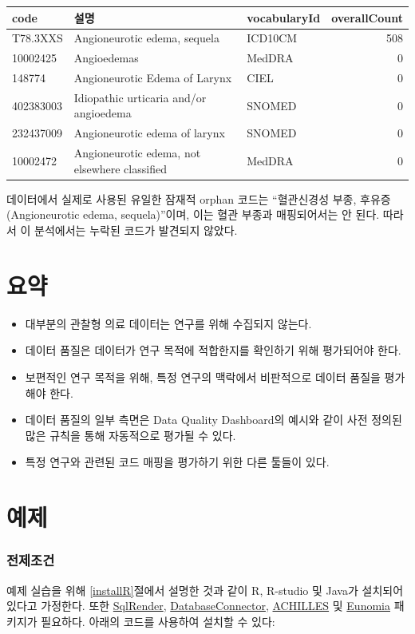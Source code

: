 \documentclass[10.5pt]{book}
\theoremstyle{definition}
\theoremstyle{definition}
\theoremstyle{definition}
\theoremstyle{remark}
\let\BeginKnitrBlock\begin \let\EndKnitrBlock\end
\begin{document}
\begin{longtable}[]{@{}lllr@{}}
\toprule
code & 설명 & vocabularyId & overallCount\tabularnewline
\midrule
\endhead
T78.3XXS & Angioneurotic edema, sequela & ICD10CM & 508\tabularnewline
10002425 & Angioedemas & MedDRA & 0\tabularnewline
148774 & Angioneurotic Edema of Larynx & CIEL & 0\tabularnewline
402383003 & Idiopathic urticaria and/or angioedema & SNOMED &
0\tabularnewline
232437009 & Angioneurotic edema of larynx & SNOMED & 0\tabularnewline
10002472 & Angioneurotic edema, not elsewhere classified & MedDRA &
0\tabularnewline
\bottomrule
\end{longtable}

데이터에서 실제로 사용된 유일한 잠재적 orphan 코드는 ``혈관신경성 부종,
후유증(Angioneurotic edema, sequela)''이며, 이는 혈관 부종과
매핑되어서는 안 된다. 따라서 이 분석에서는 누락된 코드가 발견되지
않았다.

\section{요약}\label{-13}

\BeginKnitrBlock{rmdsummary}
\begin{itemize}
\item
  대부분의 관찰형 의료 데이터는 연구를 위해 수집되지 않는다.
\item
  데이터 품질은 데이터가 연구 목적에 적합한지를 확인하기 위해 평가되어야
  한다.
\item
  보편적인 연구 목적을 위해, 특정 연구의 맥락에서 비판적으로 데이터
  품질을 평가해야 한다.
\item
  데이터 품질의 일부 측면은 Data Quality Dashboard의 예시와 같이 사전
  정의된 많은 규칙을 통해 자동적으로 평가될 수 있다.
\item
  특정 연구와 관련된 코드 매핑을 평가하기 위한 다른 툴들이 있다.
\end{itemize}
\EndKnitrBlock{rmdsummary}

\section{예제}\label{-9}

\subsubsection*{전제조건}\label{-7}

예제 실습을 위해 \ref{installR}절에서 설명한 것과 같이 R, R-studio 및
Java가 설치되어 있다고 가정한다. 또한
\href{https://ohdsi.github.io/SqlRender/}{SqlRender},
\href{https://ohdsi.github.io/DatabaseConnector/}{DatabaseConnector},
\href{https://github.com/OHDSI/Achilles}{ACHILLES} 및
\href{https://ohdsi.github.io/Eunomia/}{Eunomia} 패키지가 필요하다.
아래의 코드를 사용하여 설치할 수 있다:
\end{document}
